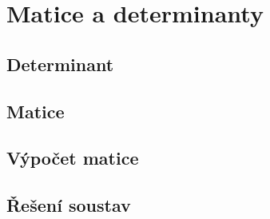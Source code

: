
\newpage
    \section{Matice a determinanty}

        \subsection{Determinant}
        \subsection{Matice}
        \subsection{Výpočet matice}
        \subsection{Řešení soustav}